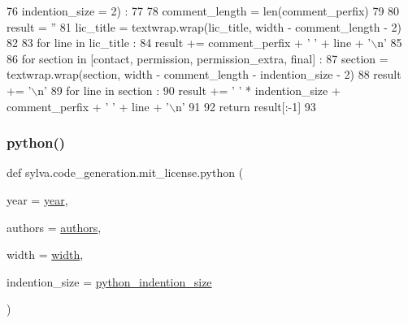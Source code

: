 \begin{DoxyCode}
76   indention\_size = 2) :
77 
78   comment\_length = len(comment\_perfix)
79 
80   result = \textcolor{stringliteral}{''}
81   lic\_title = textwrap.wrap(lic\_title, width - comment\_length - 2)
82 
83   \textcolor{keywordflow}{for} line \textcolor{keywordflow}{in} lic\_title :
84     result += comment\_perfix + \textcolor{stringliteral}{' '} + line + \textcolor{stringliteral}{'\(\backslash\)n'}
85 
86   \textcolor{keywordflow}{for} section \textcolor{keywordflow}{in} [contact, permission, permission\_extra, final] :
87     section = textwrap.wrap(section, width - comment\_length - indention\_size - 2)
88     result += \textcolor{stringliteral}{'\(\backslash\)n'}
89     \textcolor{keywordflow}{for} line \textcolor{keywordflow}{in} section :
90       result += \textcolor{stringliteral}{' '} * indention\_size + comment\_perfix + \textcolor{stringliteral}{' '} + line + \textcolor{stringliteral}{'\(\backslash\)n'}
91 
92   \textcolor{keywordflow}{return} result[:-1]
93 
\end{DoxyCode}
\mbox{\label{namespacesylva_1_1code__generation_1_1mit__license_a544584e18569581883f2982154c52965}} 
\subsubsection{\texorpdfstring{python()}{python()}}
{\footnotesize\ttfamily def sylva.\+code\+\_\+generation.\+mit\+\_\+license.\+python (\begin{DoxyParamCaption}\item[{}]{year = {\ttfamily \hyperlink{namespacesylva_1_1code__generation_1_1mit__license_a4902e976e16e0ac4d890af277506dc41}{year}},  }\item[{}]{authors = {\ttfamily \hyperlink{namespacesylva_1_1code__generation_1_1mit__license_ab235b5262a6f93e7dcdef3c73e16621a}{authors}},  }\item[{}]{width = {\ttfamily \hyperlink{namespacesylva_1_1code__generation_1_1mit__license_aec2b80ac82983fcc3ba9bae02fb001d1}{width}},  }\item[{}]{indention\+\_\+size = {\ttfamily \hyperlink{namespacesylva_1_1code__generation_1_1mit__license_a56cd97ae81f6c650978da8a12f279175}{python\+\_\+indention\+\_\+size}} }\end{DoxyParamCaption})}



